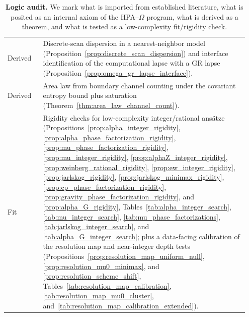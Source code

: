 \begin{table}[t]
\begin{tabular}{@{}p{0.14\linewidth}p{0.81\linewidth}@{}}
Derived & Discrete-scan dispersion in a nearest-neighbor model (Proposition~\ref{prop:discrete_scan_dispersion}) and interface identification of the computational lapse with a GR lapse (Proposition~\ref{prop:omega_gr_lapse_interface}). \\
Derived & Area law from boundary channel counting under the covariant entropy bound plus saturation (Theorem~\ref{thm:area_law_channel_count}). \\
Fit & Rigidity checks for low-complexity integer/rational ans\"atze (Propositions~\ref{prop:alpha_integer_rigidity}, \ref{prop:alpha_phase_factorization_rigidity}, \ref{prop:mu_phase_factorization_rigidity}, \ref{prop:mu_integer_rigidity}, \ref{prop:alphaZ_integer_rigidity}, \ref{prop:weinberg_rational_rigidity}, \ref{prop:ew_integer_rigidity}, \ref{prop:jarlskog_rigidity}, \ref{prop:jarlskog_minimax_rigidity}, \ref{prop:cp_phase_factorization_rigidity}, \ref{prop:gravity_phase_factorization_rigidity}, and \ref{prop:alpha_G_rigidity}, Tables~\ref{tab:alpha_integer_search}, \ref{tab:mu_integer_search}, \ref{tab:mu_phase_factorizations}, \ref{tab:jarlskog_integer_search}, and \ref{tab:alpha_G_integer_search}; plus a data-facing calibration of the resolution map and near-integer depth tests (Propositions~\ref{prop:resolution_map_uniform_null}, \ref{prop:resolution_mu0_minimax}, and \ref{prop:resolution_scheme_shift}, Tables~\ref{tab:resolution_map_calibration}, \ref{tab:resolution_map_mu0_cluster}, and~\ref{tab:resolution_map_calibration_extended}). \\
\bottomrule
\end{tabular}
\caption{\textbf{Logic audit.} We mark what is imported from established literature, what is posited as an internal axiom of the HPA--$\Omega$ program, what is derived as a theorem, and what is tested as a low-complexity fit/rigidity check.}
\label{tab:logic_audit}
\end{table}
